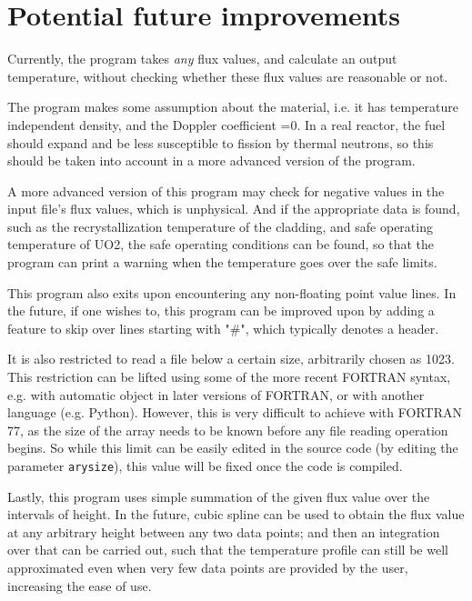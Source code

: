 \documentclass[a4paper, 12pt]{article}
\begin{document}
\section{Potential future improvements}
Currently, the program takes \emph{any} flux values, and calculate an output temperature, without checking whether these flux values are reasonable or not.

The program makes some assumption about the material, i.e. it has temperature independent density, and the Doppler coefficient =0. In a real reactor, the fuel should expand and be less susceptible to fission by thermal neutrons, so this should be taken into account in a more advanced version of the program.

A more advanced version of this program may check for negative values in the input file's flux values, which is unphysical. And if the appropriate data is found, such as the recrystallization temperature of the cladding, and safe operating temperature of UO2, the safe operating conditions can be found, so that the program can print a warning when the temperature goes over the safe limits.

This program also exits upon encountering any non-floating point value lines. In the future, if one wishes to, this program can be improved upon by adding a feature to skip over lines starting with "\#", which typically denotes a header.

It is also restricted to read a file below a certain size, arbitrarily chosen as 1023. This restriction can be lifted using some of the more recent FORTRAN syntax, e.g. with automatic object in later versions of FORTRAN, or with another language (e.g. Python). However, this is very difficult to achieve with FORTRAN 77, as the size of the array needs to be known before any file reading operation begins. So while this limit can be easily edited in the source code (by editing the parameter \texttt{arysize}), this value will be fixed once the code is compiled.
\cite{AutoObj}

Lastly, this program uses simple summation of the given flux value over the intervals of height. In the future, cubic spline can be used to obtain the flux value at any arbitrary height between any two data points; and then an integration over that can be carried out, such that the temperature profile can still be well approximated even when very few data points are provided by the user, increasing the ease of use.
\end{document}
